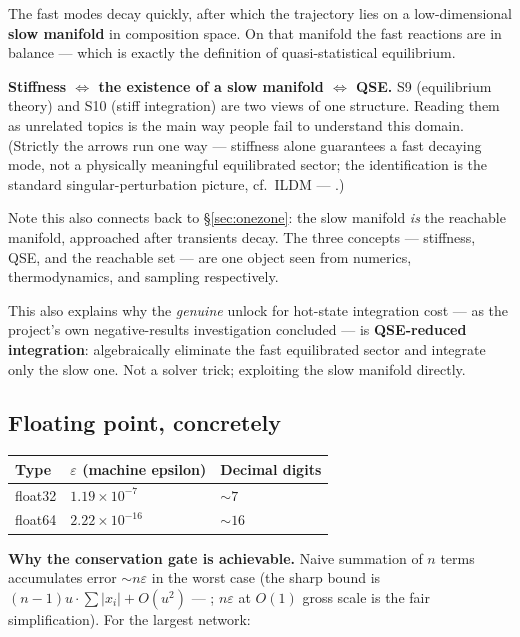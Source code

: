 The fast modes decay quickly, after which the trajectory lies on a
low-dimensional \textbf{slow manifold} in composition space. On that manifold
the fast reactions are in balance --- which is exactly the definition of
quasi-statistical equilibrium.

\begin{result}
\textbf{Stiffness $\iff$ the existence of a slow manifold $\iff$ QSE.} S9
(equilibrium theory) and S10 (stiff integration) are two views of one structure.
Reading them as unrelated topics is the main way people fail to understand this
domain. (Strictly the arrows run one way --- stiffness alone guarantees a fast
decaying mode, not a physically meaningful equilibrated sector; the
identification is the standard singular-perturbation picture, cf.\ ILDM ---
\citealt{maas1992}.)
\end{result}

Note this also connects back to \S\ref{sec:onezone}: the slow manifold \emph{is}
the reachable manifold, approached after transients decay. The three concepts
--- stiffness, QSE, and the reachable set --- are one object seen from numerics,
thermodynamics, and sampling respectively.

This also explains why the \emph{genuine} unlock for hot-state integration cost
--- as the project's own negative-results investigation concluded --- is
\textbf{QSE-reduced integration}: algebraically eliminate the fast equilibrated
sector and integrate only the slow one. Not a solver trick; exploiting the slow
manifold directly.

\subsection{Floating point, concretely}
\label{sec:floatingpoint}

\begin{center}
\begin{tabular}{@{}l l l@{}}
\toprule
\textbf{Type} & \textbf{$\varepsilon$ (machine epsilon)} &
\textbf{Decimal digits} \\
\midrule
float32 & $1.19\times10^{-7}$  & ${\sim}7$ \\
float64 & $2.22\times10^{-16}$ & ${\sim}16$ \\
\bottomrule
\end{tabular}
\end{center}

\textbf{Why the conservation gate is achievable.} Naive summation of $n$ terms
accumulates error ${\sim}n\varepsilon$ in the worst case (the sharp bound is
$(n-1)u\cdot\sum|x_i| + O(u^2)$ --- \citealt{higham2002}; $n\varepsilon$ at
$O(1)$ gross scale is the fair simplification). For the largest network:

